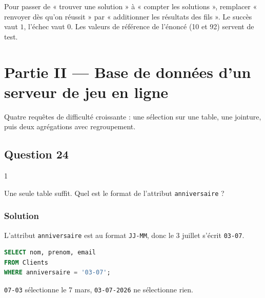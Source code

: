 \documentclass[11pt,a4paper]{article}
\begin{document}
\begin{methode}

Pour passer de « trouver une solution » à « compter les solutions », remplacer « renvoyer dès qu'on réussit » par « additionner les résultats des fils ». Le succès vaut \(1\), l'échec vaut \(0\). Les valeurs de référence de l'énoncé (10 et 92) servent de test.

\end{methode}

\hypertarget{partie-ii-base-de-donnuxe9es-dun-serveur-de-jeu-en-ligne}{%
\section{Partie II --- Base de données d'un serveur de jeu en ligne}\label{partie-ii-base-de-donnuxe9es-dun-serveur-de-jeu-en-ligne}}

Quatre requêtes de difficulté croissante : une sélection sur une table, une jointure, puis deux agrégations avec regroupement.

\hypertarget{question-24}{%
\subsection{Question 24}\label{question-24}}

\begin{indication}{1}

Une seule table suffit. Quel est le format de l'attribut \texttt{anniversaire} ?

\end{indication}

\hypertarget{solution-23}{%
\subsubsection{Solution}\label{solution-23}}

L'attribut \texttt{anniversaire} est au format \texttt{\textquotesingle{}JJ-MM\textquotesingle{}}, donc le 3 juillet s'écrit \texttt{\textquotesingle{}03-07\textquotesingle{}}.

\begin{lstlisting}[language=SQL]
SELECT nom, prenom, email
FROM Clients
WHERE anniversaire = '03-07';
\end{lstlisting}

\begin{piege}

\texttt{\textquotesingle{}07-03\textquotesingle{}} sélectionne le 7 mars, \texttt{\textquotesingle{}03-07-2026\textquotesingle{}} ne sélectionne rien.

\end{piege}
\end{document}
